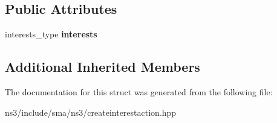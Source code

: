 \subsection*{Public Attributes}
\begin{DoxyCompactItemize}
\item 
\hypertarget{structsma_1_1CreateInterestAction_a4ebb99cb0958d70c29131434dcca78aa}{interests\-\_\-type {\bfseries interests}}\label{structsma_1_1CreateInterestAction_a4ebb99cb0958d70c29131434dcca78aa}

\end{DoxyCompactItemize}
\subsection*{Additional Inherited Members}


The documentation for this struct was generated from the following file\-:\begin{DoxyCompactItemize}
\item 
ns3/include/sma/ns3/createinterestaction.\-hpp\end{DoxyCompactItemize}
